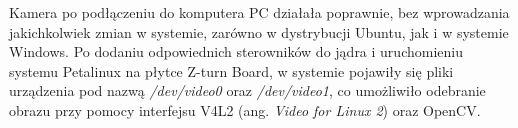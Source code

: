 Kamera po podłączeniu do komputera PC działała poprawnie, bez wprowadzania jakichkolwiek zmian w systemie, zarówno w 
dystrybucji Ubuntu, jak i w systemie Windows. Po dodaniu odpowiednich sterowników do jądra i uruchomieniu systemu Petalinux 
na płytce Z-turn Board, w systemie pojawiły się pliki urządzenia pod nazwą \emph{/dev/video0} oraz \emph{/dev/video1}, co 
umożliwiło odebranie obrazu przy pomocy interfejsu V4L2 (ang. \emph{Video for Linux 2}) oraz OpenCV.
